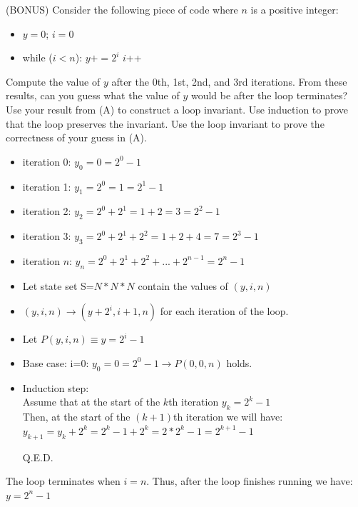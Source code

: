 \documentclass[solution, letterpaper]{cs20inclass}
\begin{document}
\problem (BONUS) Consider the following piece of code where $n$ is a positive integer:
\begin{itemize}
\item $y=0$; $i=0$
\item while ($i< n$):
\subitem $y += 2^i$
\subitem $i$++
\end{itemize}
\subproblem Compute the value of $y$ after the 0th, 1st, 2nd, and 3rd iterations. From these results, can you guess what the value of $y$ would be after the loop terminates?
\subproblem Use your result from (A) to construct a loop invariant.
\subproblem Use induction to prove that the loop preserves the invariant.
\subproblem Use the loop invariant to prove the correctness of your guess in (A).

\begin{solution}
\subsolution
\begin{itemize}
\item iteration 0: $y_0=0=2^0-1$
\item iteration 1: $y_1=2^0=1=2^1-1$
\item iteration 2: $y_2=2^0+2^1=1+2=3=2^2-1$
\item iteration 3: $y_3=2^0+2^1+2^2=1+2+4=7=2^3-1$
\item iteration $n$: $y_n=2^0+2^1+2^2+...+2^{n-1}=2^n-1$
\end{itemize}
\subsolution
\begin{itemize}
\item Let state set S=$N*N*N$ contain the values of $(y, i, n)$
\item $(y,i,n) \rightarrow (y+2^i, i+1, n)$ for each iteration of the loop.
\item Let $P(y, i, n)\equiv y=2^i -1$ 
\end{itemize}
\subsolution
\begin{itemize}
\item Base case: i=0: $y_0=0=2^0-1 \rightarrow P(0,0,n)$ holds.
\item Induction step: \\
Assume that at the start of the $k$th iteration $y_k=2^k-1$\\
Then, at the start of the $(k+1)$th iteration we will have:\\
$y_{k+1}=y_k+2^k=2^k-1+2^k=2*2^k-1=2^{k+1}-1$ 

Q.E.D.
\end{itemize}
\subsolution
The loop terminates when $i=n$. Thus, after the loop finishes running we have: $y=2^{n}-1$
\end{solution}
\end{document}
